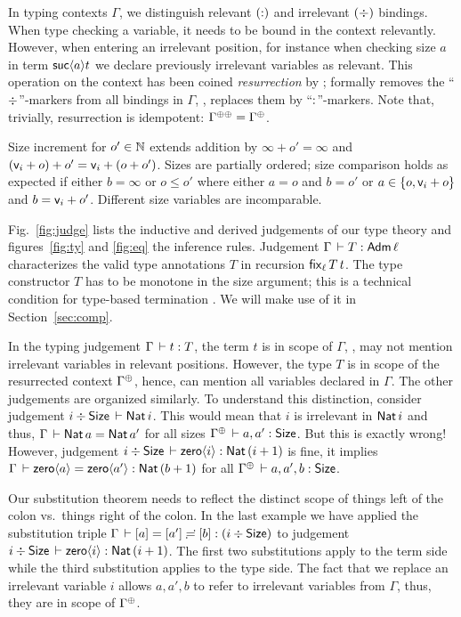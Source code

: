 \documentclass[acmlarge,review,anonymous]{acmart}\settopmatter{printfolios=true}
\begin{document}


In typing contexts $\Gamma$, we distinguish relevant $(\noterased)$ and irrelevant $(\erased)$ bindings.
When type checking a variable, it needs to be bound in the context relevantly.  However, when entering an irrelevant position, for instance when checking size $a$ in term $\suc a t$ we declare previously irrelevant variables as relevant.
This operation on the context has been coined
\emph{resurrection} by \citet{pfenning:lics01}; formally \fbox{$\resurrect\Gamma$} removes
the ``$\erased$''-markers from all bindings in $\Gamma$, \ie, replaces
them by ``$\noterased$''-markers.  Note that, trivially, resurrection is idempotent: $\resurrecttwice\Gamma = \resurrect{\Gamma}$.

Size increment  for $o' \in \NN$ extends addition by $\infty + o' = \infty$ and $(\ind i + o) + o' = \ind i + (o + o')$.  Sizes are partially ordered; size comparison  holds as expected if either $b = \infty$ or  $o \leq o'$ where either $a = o$ and $b = o'$ or $a \in \{ o, \ind i + o \}$ and $b = \ind i + o'$.
Different size variables are incomparable.




Fig.~\ref{fig:judge} lists the inductive and derived judgements of our type theory and
figures~\ref{fig:ty} and \ref{fig:eq} the inference rules.
Judgement $\Gamma \der T : \Adm \ell$ characterizes the valid type
annotations $T$ in recursion $\fix[\ell] T t$.  The type constructor $T$
has to be monotone in the size argument; this is a technical condition
for type-based termination \cite{gimenez:typeBased}.  We will make use
of it in Section~\ref{sec:comp}.

In the typing judgement $\Gamma \der t : T$, the term $t$ is in scope of
$\Gamma$, \ie, may not mention irrelevant variables in relevant
positions.  However, the type $T$ is in scope of the resurrected
context $\resurrect\Gamma$, hence, can mention all variables declared
in $\Gamma$.  The other judgements are organized similarly.  To
understand this distinction, consider judgement
$i \div \Size \der \Nat i$.  This would mean that $i$ is irrelevant in
$\Nat i$ and thus, $\Gamma \der \Nat a = \Nat {a'}$ for all sizes
$\resurrect\Gamma \der a,a' : \Size$.  But this is exactly wrong!  However,
judgement $i \div \Size \der \zero i : \Nat (i + 1)$ is fine, it
implies $\Gamma \der \zero a = \zero {a'} : \Nat (b+1)$ for all
$\resurrect\Gamma \der a,a',b : \Size$.

Our substitution theorem
needs to reflect the distinct scope of things left of the colon vs.\
things right of the colon.  In the last example we have applied the
substitution triple $\Gamma \der [a] = [a'] \eeq [b] : (i \div \Size)$
to judgement $i \div \Size \der \zero i : \Nat (i + 1)$.
The first two substitutions apply to the term side while the third
substitution applies to the type side.  The fact that we replace an
irrelevant variable $i$ allows $a,a',b$ to refer to irrelevant
variables from $\Gamma$, thus, they are in scope of $\resurrect\Gamma$.
\end{document}

